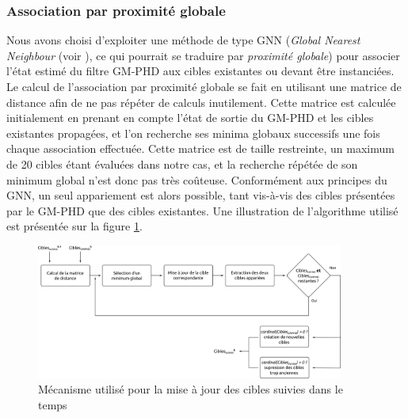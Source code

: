 \subsubsection{Association par proximité globale}
Nous avons choisi d'exploiter une méthode de type GNN (\emph{Global Nearest Neighbour} (voir \cite{Blackman2004}), ce qui pourrait se traduire par \textit{proximité globale}) pour associer l'état estimé du filtre GM-PHD aux cibles existantes ou devant être instanciées. Le calcul de l'association par proximité globale se fait en utilisant une matrice de distance afin de ne pas répéter de calculs inutilement. Cette matrice est calculée initialement en prenant en compte l'état de sortie du GM-PHD et les cibles existantes propagées, et l'on recherche ses minima globaux successifs une fois chaque association effectuée. Cette matrice est de taille restreinte, un maximum de 20 cibles étant évaluées dans notre cas, et la recherche répétée de son minimum global n'est donc pas très coûteuse. Conformément aux principes du GNN, un seul appariement est alors possible, tant vis-à-vis des cibles présentées par le GM-PHD que des cibles existantes. Une illustration de l'algorithme utilisé est présentée sur la figure \ref{fig:ch5_GNN}.\\
%

\begin{figure}[h]
	\centering
	\includegraphics[width = 0.9\textwidth]{Chapter5/graphics/GNN.png}
	\caption{Mécanisme utilisé pour la mise à jour des cibles suivies dans le temps}
	\label{fig:ch5_GNN}
\end{figure}

